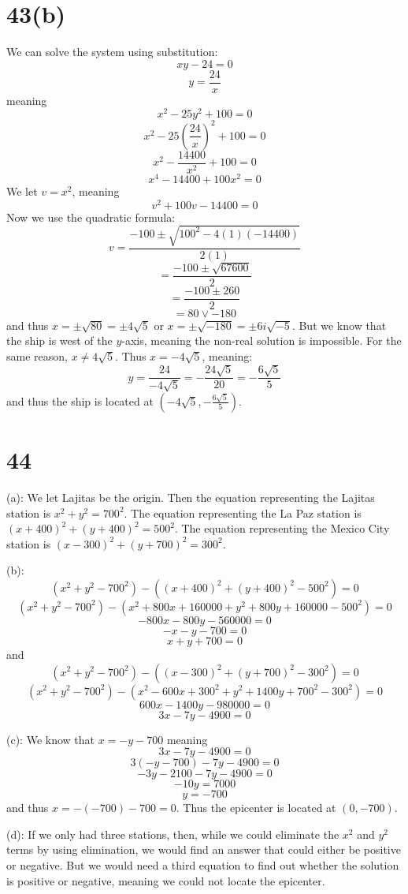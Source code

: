 \documentclass{article}
\theoremstyle{definition}
\newcommand{\?}{\stackrel{?}{=}}
\begin{document}
\section*{43(b)}
\begin{samepage}
We can solve the system using substitution:
\[ xy-24=0 \] \[ y=\frac{24}{x} \] meaning
\[ x^2-25y^2+100=0 \] \[ x^2-25(\frac{24}{x})^2+100=0 \]
\[ x^2-\frac{14400}{x^2}+100=0 \]
\[ x^4-14400+100x^2=0 \]
We let $v=x^2$, meaning
\[ v^2+100v-14400=0 \]
Now we use the quadratic formula:
\[ v=\frac{-100\pm\sqrt{100^2-4(1)(-14400)}}{2(1)} \]
\[ =\frac{-100\pm\sqrt{67600}}{2} \]
\[ =\frac{-100\pm 260}{2} \]
\[ =80\vee -180 \]
and thus $x=\pm\sqrt{80}=\pm 4\sqrt{5}$ or $x=\pm\sqrt{-180}=\pm 6i\sqrt{-5}$. But we know that the ship is west of the $y$-axis, meaning the non-real solution is impossible. For the same 
reason, $x\ne 4\sqrt{5}$. Thus 
$x=-4\sqrt{5}$, meaning:
\[ y=\frac{24}{-4\sqrt{5}}=-\frac{24\sqrt{5}}{20}=-\frac{6\sqrt{5}}{5} \] and thus the ship is located at 
$(-4\sqrt{5},-\frac{6\sqrt{5}}{5})$.
\end{samepage}

\section*{44}
(a): We let Lajitas be the origin. Then the equation representing the Lajitas station is $x^2+y^2=700^2$. The equation representing the La Paz station is
$(x+400)^2+(y+400)^2=500^2$. The equation representing the Mexico City station is $(x-300)^2+(y+700)^2=300^2$.


(b):
\[ (x^2+y^2-700^2)-((x+400)^2+(y+400)^2-500^2)=0 \]
\[ (x^2+y^2-700^2)-(x^2+800x+160000+y^2+800y+160000-500^2)=0 \]
\[ -800x-800y-560000=0 \]
\[ -x-y-700=0 \] \[ x+y+700=0 \]
and
\[ (x^2+y^2-700^2)-((x-300)^2+(y+700)^2-300^2)=0 \]
\[ (x^2+y^2-700^2)-(x^2-600x+300^2+y^2+1400y+700^2-300^2)=0 \]
\[ 600x-1400y-980000=0 \]
\[ 3x-7y-4900=0 \]


(c):
We know that $x=-y-700$ meaning
\[ 3x-7y-4900=0 \]
\[ 3(-y-700)-7y-4900=0 \]
\[ -3y-2100-7y-4900=0 \]
\[ -10y=7000 \]
\[ y=-700 \]
and thus $x=-(-700)-700=0$. Thus the epicenter is located at $(0,-700)$.


(d): If we only had three stations, then, while we could eliminate the $x^2$ and $y^2$ terms by using elimination, we would find an answer that could either be positive or negative. But we would 
need a third equation to find out whether the solution is positive or negative, meaning we could not locate the epicenter.
\end{document}
